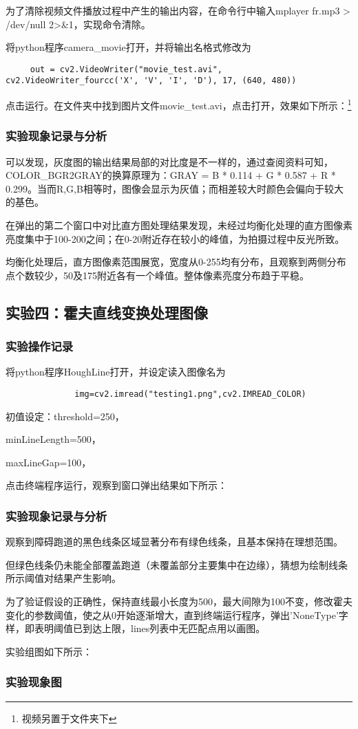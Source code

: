 \documentclass{article}
\begin{document}
为了清除视频文件播放过程中产生的输出内容，在命令行中输入mplayer fr.mp3  > /dev/null  2>&1，实现命令清除。

将python程序camera\_movie打开，并将输出名格式修改为
\begin{lstlisting}
     out = cv2.VideoWriter("movie_test.avi", cv2.VideoWriter_fourcc('X', 'V', 'I', 'D'), 17, (640, 480))
\end{lstlisting}
点击运行。在文件夹中找到图片文件movie\_test.avi，点击打开，效果如下所示：\footnote{视频另置于文件夹下}





\subsubsection{实验现象记录与分析}
可以发现，灰度图的输出结果局部的对比度是不一样的，通过查阅资料可知，COLOR\_BGR2GRAY的换算原理为：GRAY = B * 0.114 + G * 0.587 + R * 0.299。当而R,G,B相等时，图像会显示为灰值；而相差较大时颜色会偏向于较大的基色。

在弹出的第二个窗口中对比直方图处理结果发现，未经过均衡化处理的直方图像素亮度集中于100-200之间；在0-20附近存在较小的峰值，为拍摄过程中反光所致。

均衡化处理后，直方图像素范围展宽，宽度从0-255均有分布，且观察到两侧分布点个数较少，50及175附近各有一个峰值。整体像素亮度分布趋于平稳。


\subsection{实验四：霍夫直线变换处理图像}
\subsubsection{实验操作记录}
将python程序HoughLine打开，并设定读入图像名为
\begin{lstlisting}
              img=cv2.imread("testing1.png",cv2.IMREAD_COLOR)
\end{lstlisting}

初值设定：threshold=250，

minLineLength=500，

maxLineGap=100，

点击终端程序运行，观察到窗口弹出结果如下所示：


\subsubsection{实验现象记录与分析}
观察到障碍跑道的黑色线条区域显著分布有绿色线条，且基本保持在理想范围。

但绿色线条仍未能全部覆盖跑道（未覆盖部分主要集中在边缘），猜想为绘制线条所示阈值对结果产生影响。

为了验证假设的正确性，保持直线最小长度为500，最大间隙为100不变，修改霍夫变化的参数阈值，使之从0开始逐渐增大，直到终端运行程序，弹出'NoneType'字样，即表明阈值已到达上限，lines列表中无匹配点用以画图。

实验组图如下所示：

\subsubsection{实验现象图}
\end{document}
